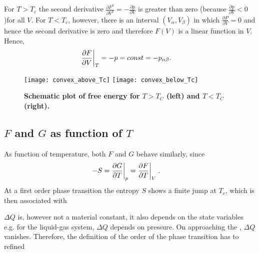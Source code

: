 For $T>T_{c}$ the second derivative $\frac{\partial F^{2}}{\partial V^{2}}=-\frac{\partial p}{\partial V}$ is greater than zero (because $\frac{\partial p}{\partial V}<0$)for all $V$.
For $T<T_{c}$, however, there is an interval $(V_{\alpha},V_{\beta})$ in which $\frac{\partial P}{\partial V}=0$ and hence the second derivative is zero and therefore $F(V)$ is a linear function in $V$. Hence,
%
\begin{align*}
\frac{\partial F}{\partial V}\bigg|_{T} &= -p = const = -p_{\alpha\beta}.
\end{align*}
% 

\begin{figure}[ht]
\begin{center}
\texttt{[image: convex\_above\_Tc]}
\hfill
\texttt{[image: convex\_below\_Tc]}
\caption{{\bf Schematic plot of free energy for $T>T_{C}$ (left) and $T<T_{C}$ (right).}}
\end{center}
\end{figure}


%

\newpage

\subsection{$F$ and $G$ as function of $T$}

As function of temperature, both $F$ and $G$ behave similarly, since
%
\begin{align*}
-S&=\frac{\partial G}{\partial T}\bigg|_{p}=\frac{\partial F}{\partial T}\bigg|_{V}\;.
\end{align*}
%
At a first order phase transition the entropy $S$ shows a finite jump at $T_{c}$,
which is then associated with 

$\Delta Q$ is, however not a material constant, it also depends on the state variables e.g.
for the liquid-gas system, $\Delta Q$ depends on pressure. On approaching the ,
$\Delta Q$ vanishes. Therefore, the definition of the order of the phase transition has to refined
